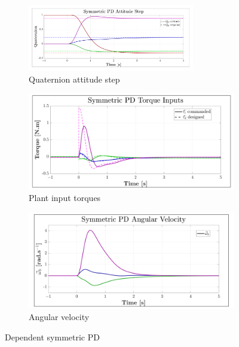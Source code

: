 \begin{figure}[htbp]
\centering
\begin{subfigure}{\textwidth}
\centering
\includegraphics[width=0.8\textwidth]{graphs/PD_3x3_Dependent_Step}
\vspace{-8pt}
\caption{Quaternion attitude step}
\label{fig:PD_3x3_Dependent_Step}
\end{subfigure}
\begin{subfigure}{0.49\textwidth}
\vspace{4pt}
\centering
\includegraphics[width=\textwidth]{graphs/PD_3x3_Dependent_Torque}
\caption{Plant input torques}
\label{fig:PD_3x3_Dependent_Torque}
\end{subfigure}
\begin{subfigure}{0.49\textwidth}
\centering
\includegraphics[width=\textwidth]{graphs/PD_3x3_Dependent_Angular}
\caption{Angular velocity}
\label{fig:PD_3x3_Dependent_Angular}
\end{subfigure}
\caption{Dependent symmetric PD}
\end{figure}
